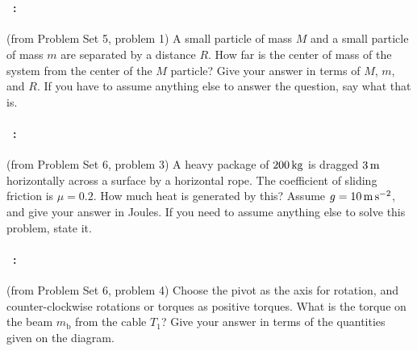 \documentclass[12pt]{article} 
\begin{document}
\vfill
~
\clearpage
\paragraph{\problemname~\theproblem:}%
(from Problem Set 5, problem 1) A small particle of mass $M$ and a small particle of mass
$m$ are separated by a distance $R$. How far is the center of mass of
the system from the center of the $M$ particle? Give your answer in terms of
$M$, $m$, and $R$. If you have to assume anything else to answer the
question, say what that is.

\vfill

\paragraph{\problemname~\theproblem:}%
(from Problem Set 6, problem 3) A heavy package of $200\,\mathrm{kg}$ is
dragged $3\,\mathrm{m}$ horizontally across a surface by a horizontal
rope. The coefficient of sliding friction is $\mu = 0.2$. How much
heat is generated by this?  Assume $g = 10\,\mathrm{m}\,\mathrm{s}^{-2}$, and give your
answer in Joules. If you need to assume anything else to solve this
problem, state it.

\vfill

\paragraph{\problemname~\theproblem:}%
(from Problem Set 6, problem 4) Choose the pivot as the axis for
rotation, and counter-clockwise rotations or torques as positive
torques. What is the torque on the beam $m_\mathrm{b}$ from the cable $T_1$?
Give your answer in terms of the quantities given on the diagram.

\vfill
~
\end{document}
